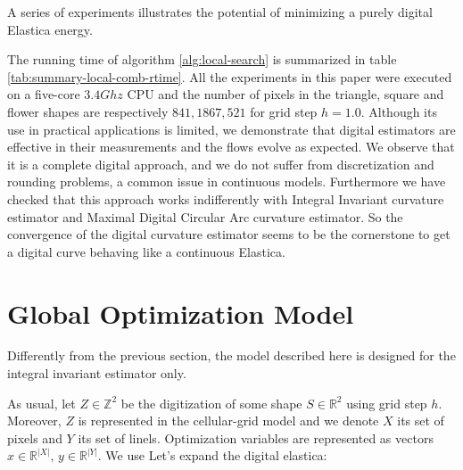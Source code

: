 		

A series of experiments  illustrates the potential of minimizing a purely digital Elastica energy. 


The running time of algorithm \ref{alg:local-search} is summarized in table \ref{tab:summary-local-comb-rtime}. All the
experiments in this paper were executed on a five-core $3.4Ghz$ CPU and the number of pixels in the triangle, square and
flower shapes are respectively $841,1867,521$ for grid step $h=1.0$. Although its use in practical applications is
limited, we demonstrate that digital estimators are effective in their measurements and the flows evolve as expected. We
observe that it is a complete digital approach, and we do not suffer from discretization and rounding problems, a common
issue in continuous models.  Furthermore we have checked that this approach works indifferently with Integral Invariant
curvature estimator and Maximal Digital Circular Arc curvature estimator. So the convergence of the digital curvature
estimator seems to be the cornerstone to get a digital curve behaving like a continuous Elastica.  


\section{Global Optimization Model}

Differently from the previous section, the model described here is designed for the integral invariant estimator only.

As usual, let $Z \in \mathbb{Z}^2$ be the digitization of some shape $S \in \mathbb{R}^2$ using grid step $h$. Moreover, $Z$ is represented in the cellular-grid model and we denote $X$ its set of pixels and $Y$ its set of linels. Optimization variables are represented as vectors $x \in \mathbb{R}^{|X|},\, y \in \mathbb{R}^{|Y|}$.  We use  Let's expand the digital elastica:


